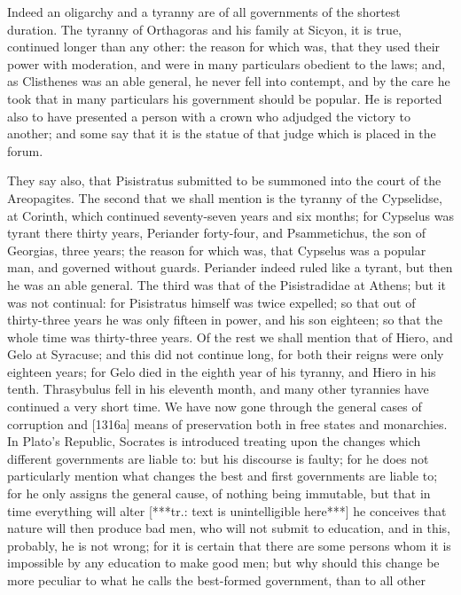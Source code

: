 
Indeed an oligarchy and a tyranny are of all governments of the shortest
duration. The tyranny of Orthagoras and his family at Sicyon, it is true,
continued longer than any other: the reason for which was, that they used
their power with moderation, and were in many particulars obedient to the
laws; and, as Clisthenes was an able general, he never fell into contempt,
and by the care he took that in many particulars his government should be
popular. He is reported also to have presented a person with a crown who
adjudged the victory to another; and some say that it is the statue of
that judge which is placed in the forum.

They say also, that Pisistratus submitted to be summoned into the court of
the Areopagites. The second that we shall mention is the tyranny of the
Cypselidse, at Corinth, which continued seventy-seven years and six
months; for Cypselus was tyrant there thirty years, Periander forty-four,
and Psammetichus, the son of Georgias, three years; the reason for which
was, that Cypselus was a popular man, and governed without guards.
Periander indeed ruled like a tyrant, but then he was an able general. The
third was that of the Pisistradidae at Athens; but it was not continual:
for Pisistratus himself was twice expelled; so that out of thirty-three
years he was only fifteen in power, and his son eighteen; so that the
whole time was thirty-three years. Of the rest we shall mention that of
Hiero, and Gelo at Syracuse; and this did not continue long, for both
their reigns were only eighteen years; for Gelo died in the eighth year of
his tyranny, and Hiero in his tenth. Thrasybulus fell in his eleventh
month, and many other tyrannies have continued a very short time. We have
now gone through the general cases of corruption and [1316a] means of
preservation both in free states and monarchies. In Plato's Republic,
Socrates is introduced treating upon the changes which different
governments are liable to: but his discourse is faulty; for he does not
particularly mention what changes the best and first governments are
liable to; for he only assigns the general cause, of nothing being
immutable, but that in time everything will alter [***tr.: text is
unintelligible here***] he conceives that nature will then produce bad
men, who will not submit to education, and in this, probably, he is not
wrong; for it is certain that there are some persons whom it is impossible
by any education to make good men; but why should this change be more
peculiar to what he calls the best-formed government, than to all other
